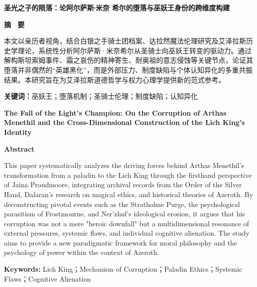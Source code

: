 \newpage
\linespread{1.5}

\begin{center} %
	{\heiti {} \textbf{圣光之子的陨落：论阿尔萨斯∙米奈
希尔的堕落与巫妖王身份的跨维度构建}}
\end{center}

\begin{center} %
	{\songti {} \textbf{摘~  要}} 
\end{center}

{

  本文以亲历者视角，结合白银之手骑士团档案、达拉然魔法伦理研究及艾泽拉斯历史学理论，系统性分析阿尔萨斯·米奈希尔从圣骑士向巫妖王转变的驱动力。通过解构斯坦索姆事件、霜之哀伤的精神寄生、耐奥祖的意志侵蚀等关键节点，论证其堕落并非偶然的“英雄黑化”，而是外部压力、制度缺陷与个体认知异化的多重共振结果。本研究旨在为艾泽拉斯道德哲学与权力心理学提供新的范式参考。

{\songti {} \textbf{关键词：}}巫妖王；堕落机制；圣骑士伦理；制度缺陷；认知异化
}


\newpage

\begin{center}
    \textbf{The Fall of the Light's Champion: On the Corruption of Arthas Menethil and the Cross-Dimensional Construction of the Lich King's Identity}
\end{center}

\begin{center}
    \textbf{Abstract}
\end{center}

{

  This paper systematically analyzes the driving forces behind Arthas Menethil’s transformation from a paladin to the Lich King through the firsthand perspective of Jaina Proudmoore, integrating archival records from the Order of the Silver Hand, Dalaran’s research on magical ethics, and historical theories of Azeroth. By deconstructing pivotal events such as the Stratholme Purge, the psychological parasitism of Frostmourne, and Ner’zhul’s ideological erosion, it argues that his corruption was not a mere "heroic downfall" but a multidimensional resonance of external pressures, systemic flaws, and individual cognitive alienation. The study aims to provide a new paradigmatic framework for moral philosophy and the psychology of power within the context of Azeroth.

\textbf{Keywords:} Lich King；Mechanism of Corruption；Paladin Ethics；Systemic Flaws；Cognitive Alienation
}


